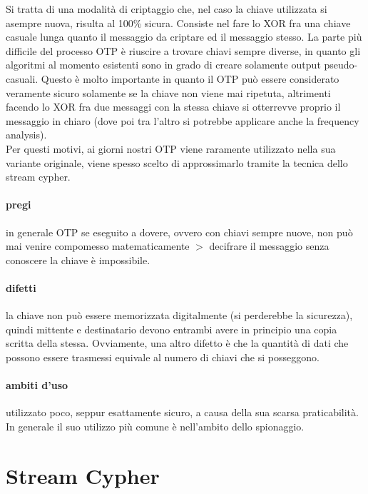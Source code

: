 \documentclass{article}
\begin{document}
Si tratta di una modalità di criptaggio che, nel caso la chiave utilizzata si
asempre nuova, risulta al 100\% sicura. Consiste nel fare lo XOR fra una chiave
casuale lunga quanto il messaggio da criptare ed il messaggio stesso. La parte
più difficile del processo OTP è riuscire a trovare chiavi sempre diverse, in
quanto gli algoritmi al momento esistenti sono in grado di creare solamente
output pseudo-casuali. Questo è molto importante in quanto il OTP può essere
considerato veramente sicuro solamente se la chiave non viene mai ripetuta,
altrimenti facendo lo XOR fra due messaggi con la stessa chiave si otterrevve
proprio il messaggio in chiaro (dove poi tra l'altro si potrebbe applicare anche
la frequency analysis).\\
Per questi motivi, ai giorni nostri OTP viene raramente utilizzato nella sua
variante originale, viene spesso scelto di approssimarlo tramite la tecnica
dello stream cypher.

\paragraph{pregi} in generale OTP se eseguito a dovere, ovvero con chiavi sempre
nuove, non può mai venire compomesso matematicamente $>$ decifrare il messaggio
senza conoscere la chiave è impossibile.

\paragraph{difetti} la chiave non può essere memorizzata digitalmente (si
perderebbe la sicurezza), quindi mittente e destinatario devono entrambi avere
in principio una copia scritta della stessa. Ovviamente, una altro difetto è che
la quantità di dati che possono essere trasmessi equivale al numero di chiavi
che si posseggono.

\paragraph{ambiti d'uso} utilizzato poco, seppur esattamente sicuro, a causa
della sua scarsa praticabilità. In generale il suo utilizzo più comune è
nell'ambito dello spionaggio.

\section{Stream Cypher}
\end{document}
